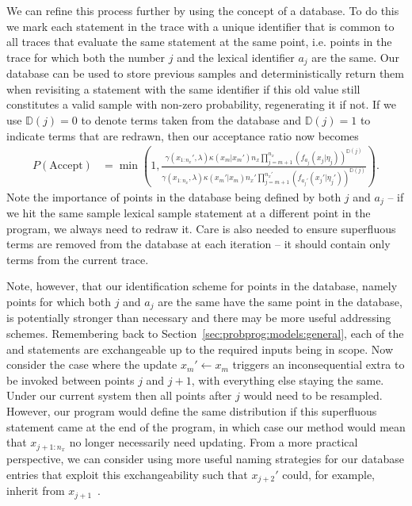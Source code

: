 We can refine this process further by using the concept of a database.  To do this we mark each \sample
statement in the trace with a unique identifier that is common to all traces that evaluate the same \sample
statement at the same point, i.e. points in the trace for which both the \sample number $j$ and 
the lexical \sample identifier $a_j$ are the same.  Our database can be used to store previous samples and
deterministically return them when revisiting a \sample statement with the same identifier if this old
value still constitutes a valid sample with non-zero probability, regenerating it if not.  
If we use $\mathbb{D}(j)=0$ to denote terms taken from
the database and $\mathbb{D}(j)=1$ to indicate terms that are redrawn, then our acceptance ratio now becomes
\begin{align}
P(\text{Accept}) &= \min\left(1, \frac{\gamma(x_{1:n_x}',\lambda) \kappa(x_m | x_{m}') n_x \prod_{j=m+1}^{n_x} 
	\left(f_{a_{j}} (x_j | \eta_j)\right)^{\mathbb{D}(j)}}
{\gamma(x_{1:n_x},\lambda) \kappa(x_m' | x_{m})  n_x' \prod_{j=m+1}^{n_x'} \left(f_{a_{j}'} (x_j' | \eta_j')\right)^{\mathbb{D}(j)}}\right).
\end{align}
Note the importance of points in the database being defined by both $j$ and $a_j$ -- if we hit the same sample
lexical sample statement at a different point in the program, we always need to redraw it.
Care is also needed to ensure superfluous terms are removed from the database at each iteration -- it should
contain only terms from the current trace.  

Note, however, that our identification scheme for points in the database, namely points for which both $j$ and $a_j$ are the same
have the same point in the database, is
potentially stronger than necessary and there may be more useful addressing schemes.  Remembering back
to Section~\ref{sec:probprog:models:general}, each of the \sample and \observe statements are exchangeable up to
the required inputs being in scope.  Now consider the case where the update $x_m'\leftarrow x_m$ triggers an
inconsequential extra \sample to be invoked between points $j$ and $j+1$, with everything else staying the same.
Under our current system then all points after $j$ would need to be resampled.  However, our program would
define the same distribution if this superfluous \sample statement came at the end of the program, in which case
our method would mean that $x_{j+1:n_x}$ no longer necessarily need updating.  From a more practical perspective,
we can consider using more useful naming strategies for our database entries that exploit this exchangeability such
that $x_{j+2}'$ could, for example, inherit from $x_{j+1}$~\citep{wingate2011lightweight}.  

